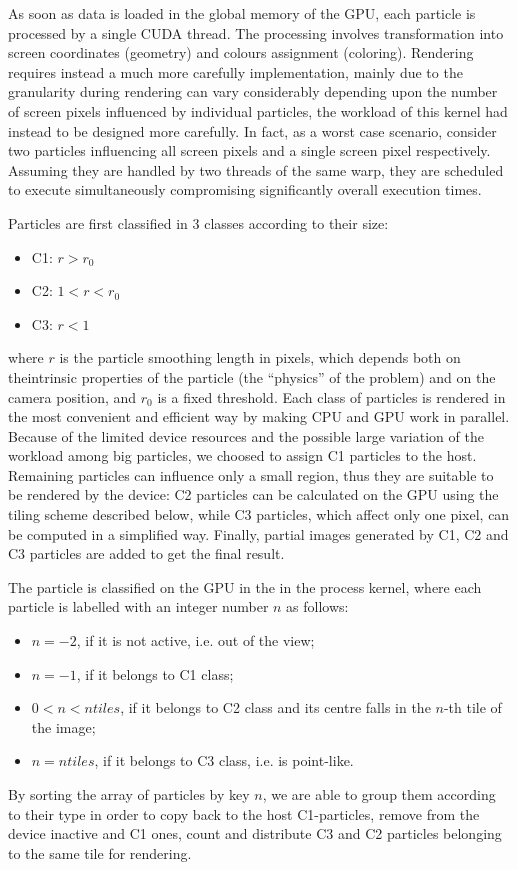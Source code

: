 \documentclass[11pt]{article}
\begin{document}

As soon as data is loaded in the global memory of the GPU, each particle is processed by a single CUDA thread. The processing involves transformation into screen coordinates (geometry) and colours assignment (coloring).
Rendering requires instead a much more carefully implementation, mainly due to 
the granularity during rendering can vary considerably depending upon the number of screen pixels influenced by individual particles, the workload of this kernel had instead to be designed more carefully.
In fact, as a worst case scenario, consider two particles influencing all screen pixels and a single screen pixel
respectively. Assuming they are handled by two threads of the same warp, they are scheduled to execute simultaneously compromising significantly overall execution times.

Particles are first classified in 3 classes according to their size:
\begin{itemize}
\item 
C1: $r > r_0$
\item
C2: $1 < r < r_0$
\item
C3: $r < 1$
\end{itemize}
where $r$ is the particle smoothing length in pixels, which depends both on theintrinsic properties of the particle (the ``physics'' of the problem) and on the camera position, and $r_0$ is a fixed threshold. Each class of particles is rendered in the most convenient and efficient way by making CPU and GPU work in parallel. Because of the limited device resources and the possible large variation of the workload among big particles, we choosed to assign C1 particles to the host. Remaining particles can influence only a small region, thus they are suitable to be rendered by the device: C2 particles can be calculated on the GPU using the tiling scheme described below, while C3 particles, which affect only one pixel, can be computed in a simplified way. Finally, partial images generated by C1, C2 and C3 particles are added to get the final result. 

The particle is classified on the GPU in the in the process kernel, where each particle is labelled with an integer number $n$ as follows:
\begin{itemize}
\item 
$n = -2$, if it is not active, i.e. out of the view;
\item
$n = -1$, if it belongs to C1 class; 
\item
$0 < n < ntiles$, if it belongs to C2 class and its centre falls in the $n$-th tile of the image;  
\item
$n = ntiles$, if it belongs to C3 class, i.e. is point-like.
\end{itemize}
By sorting the array of particles by key $n$, we are able to group them according to their type in order to copy back to the host C1-particles, remove from the device inactive and C1 ones, count and distribute C3 and C2 particles belonging to the same tile for rendering. 
\end{document}
